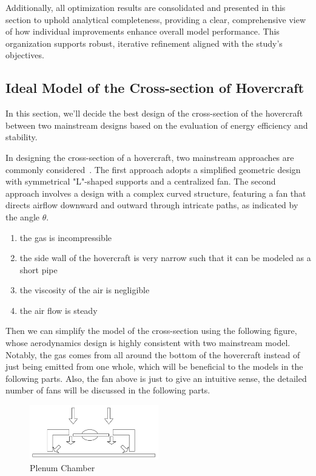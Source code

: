 Additionally, all optimization results are consolidated and presented in this section to uphold analytical completeness, providing a clear, comprehensive view of how individual improvements enhance overall model performance. This organization supports robust, iterative refinement aligned with the study's objectives.
\subsection{Ideal Model of the Cross-section of Hovercraft}
\label{sec:model}

In this section, we'll decide the best design of the cross-section of the hovercraft between two mainstream designs based on the evaluation of energy efficiency and stability.

In designing the cross-section of a hovercraft, two mainstream approaches are commonly considered~\cite{mair1964physical}.  The first approach adopts a simplified geometric design with symmetrical "L"-shaped supports and a centralized fan. The second approach involves a design with a complex curved structure, featuring a fan that directs airflow downward and outward through intricate paths, as indicated by the angle $ \theta $. 
\begin{enumerate}
    \item the gas is incompressible
    \item the side wall of the hovercraft is very narrow such that it can be modeled as a short pipe 
    \item the viscosity of the air is negligible
    \item the air flow is steady
\end{enumerate}

Then we can simplify the model of the cross-section using the following figure, whose aerodynamics design is highly consistent with two mainstream model. Notably, the gas comes from all around the bottom of the hovercraft instead of just being emitted from one whole, which will be beneficial to the models in the following parts. Also, the fan above is just to give an intuitive sense, the detailed number of fans will be discussed in the following parts.

\begin{figure}[H]
  \centering
  \includegraphics[width=0.5\textwidth]{images/PlenumChamber.jpg}
  \caption{Plenum Chamber}
  \label{fig:Plenum Chamber}
\end{figure}

